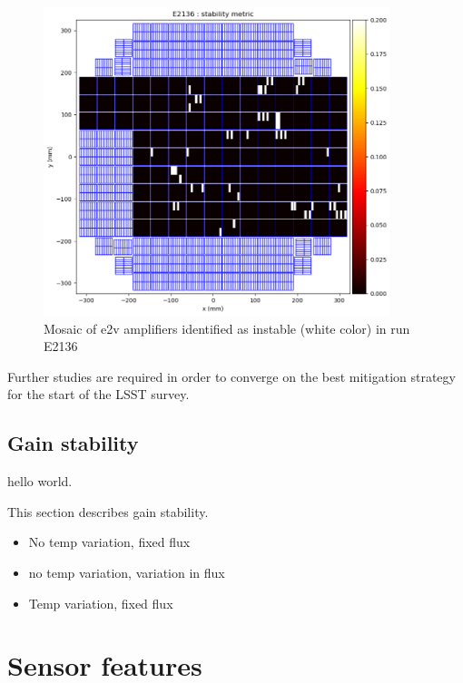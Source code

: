 \begin{figure}
\begin{centering}
\includegraphics[width=0.9\textwidth]{sections/figures/E2136_mosaic_d.png}
\end{centering}
\caption{Mosaic of e2v amplifiers identified as instable (white color)
in run E2136}
\end{figure}

Further studies are required in order to converge on the best mitigation
strategy for the start of the LSST survey.

\subsection{Gain stability}\label{gain-stability-2}

hello world.

This section describes gain stability.

\begin{itemize}
\tightlist
\item
  No temp variation, fixed flux
\item
  no temp variation, variation in flux
\item
  Temp variation, fixed flux
\end{itemize}

\section{Sensor features}\label{sensor-features}

